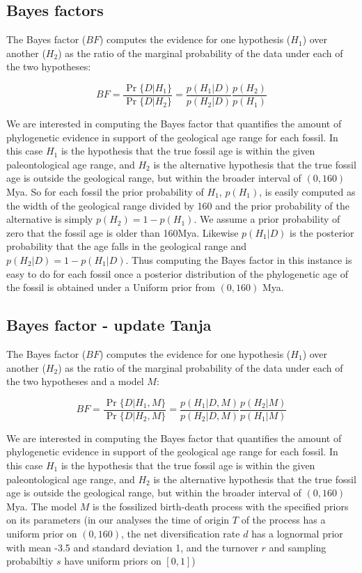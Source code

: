 \documentclass[11pt]{article}
\begin{document}
\subsection*{Bayes factors}

The Bayes factor ($BF$) computes the evidence for one hypothesis ($H_1$) over another ($H_2$) as the ratio of the marginal probability of the data under each of the two hypotheses:

\begin{equation}
BF = \frac{\Pr\{D|H_1\}}{\Pr\{D|H_2\}} = \frac{p(H_1|D)}{p(H_2|D)}\frac{p(H_2)}{p(H_1)}
\end{equation}

We are interested in computing the Bayes factor that quantifies the amount of phylogenetic evidence in support of the geological age range for each fossil. In this case $H_1$ is the hypothesis that the true fossil age is within the given paleontological age range, and $H_2$ is the alternative hypothesis that the true fossil age is outside the geological range, but within the broader interval of $(0,160)$ Mya. So for each fossil the prior probability of $H_1$, $p(H_1)$, is easily computed as the width of the geological range divided by 160 and the prior probability of the alternative is simply $p(H_2) = 1 - p(H_1)$. We assume a prior probability of zero that the fossil age is older than 160Mya. Likewise $p(H_1 | D)$ is the posterior probability that the age falls in the geological range and $p(H_2 | D) = 1 - p(H_1 | D)$. Thus computing the Bayes factor in this instance is easy to do for each fossil once a posterior distribution of the phylogenetic age of the fossil is obtained under a Uniform prior from $(0,160)$ Mya.


\subsection*{Bayes factor - update Tanja}

The Bayes factor ($BF$) computes the evidence for one hypothesis ($H_1$) over another ($H_2$) as the ratio of the marginal probability of the data under each of the two hypotheses and a model $M$:

\begin{equation}
BF = \frac{\Pr\{D|H_1,M\}}{\Pr\{D|H_2,M\}} = \frac{p(H_1|D,M)}{p(H_2|D,M)}\frac{p(H_2|M)}{p(H_1|M)}
\end{equation}

We are interested in computing the Bayes factor that quantifies the amount of phylogenetic evidence in support of the geological age range for each fossil. In this case $H_1$ is the hypothesis that the true fossil age is within the given paleontological age range, and $H_2$ is the alternative hypothesis that the true fossil age is outside the geological range, but within the broader interval of $(0,160)$ Mya. The model $M$ is the fossilized birth-death process with the specified priors on its parameters (in our analyses the time of origin $T$ of the process has a uniform prior on $(0,160)$, the net diversification rate $d$ has a lognormal prior with mean -3.5 and standard deviation 1, and the turnover $r$ and sampling probabiltiy $s$ have uniform priors on $[0,1]$)
\end{document}
